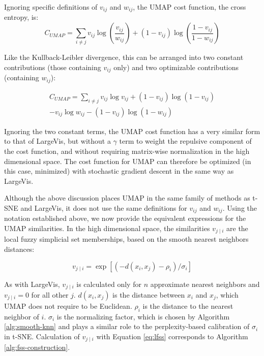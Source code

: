\documentclass[12pt]{article}
\begin{document}
Ignoring specific definitions of $v_{ij}$ and $w_{ij}$, the UMAP cost function, the cross entropy, is:
\begin{equation}
    C_{UMAP} = \sum_{i \neq j} v_{ij} \log \left( \frac{v_{ij}}{w_{ij}} \right) + 
(1 - v_{ij}) \log \left( \frac{1 - v_{ij}}{1 - w_{ij}} \right)
\end{equation}

Like the Kullback-Leibler divergence, this can be arranged into two constant contributions (those containing $v_{ij}$ only) and two optimizable contributions (containing $w_{ij}$):

\begin{equation}
\begin{aligned}
    C_{UMAP} = 
    \sum_{i \neq j} v_{ij} \log v_{ij}
    + \left(1 - v_{ij}\right) \log \left(1 - v_{ij} \right) \\
    - v_{ij} \log w_{ij}
    - \left(1 - v_{ij}\right) \log \left(1 - w_{ij} \right)
\end{aligned}
\end{equation}

Ignoring the two constant terms, the UMAP cost function has a very similar form to that of LargeVis, but without a $\gamma$ term to weight the repulsive component of the cost function, and without requiring matrix-wise normalization in the high dimensional space. The cost function for UMAP can therefore be optimized (in this case, minimized) with stochastic gradient descent in the same way as LargeVis.

Although the above discussion places UMAP in the same family of methods as t-SNE and LargeVis, it does not use the same definitions for $v_{ij}$ and $w_{ij}$. Using the notation established above, we now provide the equivalent expressions for the UMAP similarities. In the high dimensional space, the similarities $v_{j \mid i}$ are the local fuzzy simplicial set memberships, based on the smooth nearest neighbors distances:

\begin{equation}\label{eq:lfss}
    v_{j \mid i} = \exp[(-d\left(x_i, x_j\right) - \rho_{i}) / \sigma_{i}]
\end{equation}

As with LargeVis, $v_{j \mid i}$ is calculated only for $n$ approximate nearest neighbors and $v_{j \mid i} = 0$ for all other $j$. $d\left(x_i, x_j\right)$ is the distance between $x_i$ and $x_j$, which UMAP does not require to be Euclidean. $\rho_{i}$ is the distance to the nearest neighbor of $i$. $\sigma_{i}$ is the normalizing factor, which is chosen by Algorithm \ref{alg:smooth-knn} and plays a similar role to the perplexity-based calibration of $\sigma_i$ in t-SNE. Calculation of $v_{j \mid i}$ with Equation \ref{eq:lfss} corresponds to Algorithm \ref{alg:fss-construction}. 
\end{document}
